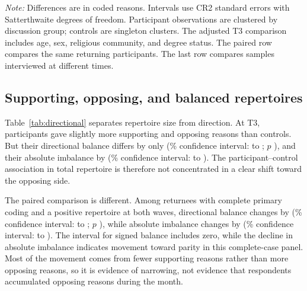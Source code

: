 \documentclass[11pt]{article}
\begin{document}
\begin{table}[htbp]
\centering
\caption{Primary and secondary respondent-level comparisons}
{\setlength{\tabcolsep}{3.5pt}}
\par
\begin{minipage}{\textwidth}
\smallskip\footnotesize
\textit{Note:} Differences are in coded reasons. Intervals use CR2 standard errors with
Satterthwaite degrees of freedom. Participant observations are clustered by discussion group;
controls are singleton clusters. The adjusted T3
comparison includes age, sex, religious community, and degree status. The paired row compares
the same returning participants. The last row compares samples interviewed at different times.
\end{minipage}
\end{table}

\subsection{Supporting, opposing, and balanced repertoires}

Table~\ref{tab:directional} separates repertoire size from direction. At T3, participants gave
slightly more supporting and opposing reasons than controls. But their directional balance
differs by only \BalanceDifference{} (\ConfidenceLevel\% confidence interval: \BalanceLow{} to
\BalanceHigh{}; $p$ \BalanceP), and their absolute imbalance by \AbsoluteDifference{}
(\ConfidenceLevel\% confidence interval: \AbsoluteLow{} to \AbsoluteHigh{}). The
participant--control association in total repertoire is therefore not concentrated in a clear
shift toward the opposing side.

The paired comparison is different. Among returnees with complete primary coding and a
positive repertoire at both waves, directional balance changes by
\PairedBalanceDifference{} (\ConfidenceLevel\% confidence interval:
\PairedBalanceLow{} to \PairedBalanceHigh{}; $p$ \PairedBalanceP), while absolute imbalance
changes by \PairedAbsoluteDifference{} (\ConfidenceLevel\% confidence interval:
\PairedAbsoluteLow{} to \PairedAbsoluteHigh{}). The interval for signed balance includes zero,
while the decline in absolute imbalance indicates movement toward parity in this complete-case panel. Most of the movement comes from fewer supporting reasons rather than more
opposing reasons, so it is evidence of narrowing, not evidence that respondents accumulated
opposing reasons during the month.
\end{document}
